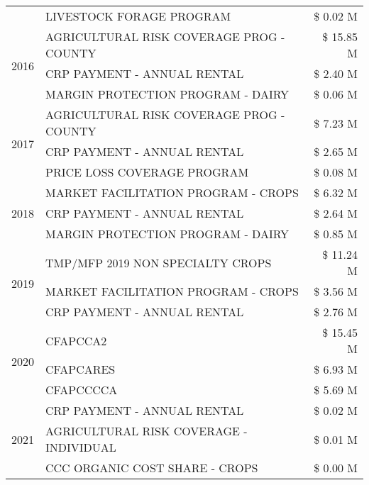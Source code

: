 \begin{tabular}{llr}
 & LIVESTOCK FORAGE PROGRAM & \$ 0.02 M \\
\cline{1-3}
\multirow[t]{3}{*}{2016} & AGRICULTURAL RISK COVERAGE PROG - COUNTY      & \$ 15.85 M \\
 & CRP PAYMENT - ANNUAL RENTAL                   & \$ 2.40 M \\
 & MARGIN PROTECTION PROGRAM - DAIRY             & \$ 0.06 M \\
\cline{1-3}
\multirow[t]{3}{*}{2017} & AGRICULTURAL RISK COVERAGE PROG - COUNTY & \$ 7.23 M \\
 & CRP PAYMENT - ANNUAL RENTAL & \$ 2.65 M \\
 & PRICE LOSS COVERAGE PROGRAM & \$ 0.08 M \\
\cline{1-3}
\multirow[t]{3}{*}{2018} & MARKET FACILITATION PROGRAM - CROPS & \$ 6.32 M \\
 & CRP PAYMENT - ANNUAL RENTAL & \$ 2.64 M \\
 & MARGIN PROTECTION PROGRAM - DAIRY & \$ 0.85 M \\
\cline{1-3}
\multirow[t]{3}{*}{2019} & TMP/MFP 2019 NON SPECIALTY CROPS & \$ 11.24 M \\
 & MARKET FACILITATION PROGRAM - CROPS & \$ 3.56 M \\
 & CRP PAYMENT - ANNUAL RENTAL & \$ 2.76 M \\
\cline{1-3}
\multirow[t]{3}{*}{2020} & CFAPCCA2 & \$ 15.45 M \\
 & CFAPCARES & \$ 6.93 M \\
 & CFAPCCCCA & \$ 5.69 M \\
\cline{1-3}
\multirow[t]{3}{*}{2021} & CRP PAYMENT - ANNUAL RENTAL & \$ 0.02 M \\
 & AGRICULTURAL RISK COVERAGE - INDIVIDUAL & \$ 0.01 M \\
 & CCC ORGANIC COST SHARE - CROPS & \$ 0.00 M \\
\cline{1-3}
\bottomrule
\end{tabular}
